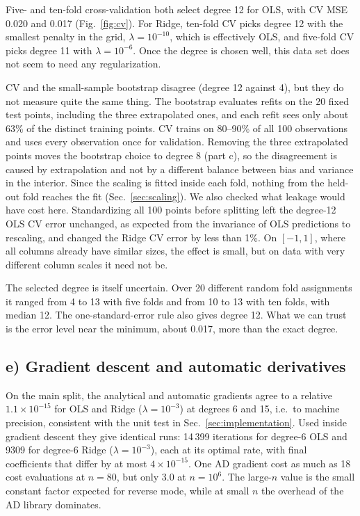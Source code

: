 \documentclass[aps,prb,reprint,superscriptaddress,nofootinbib,longbibliography,floatfix]{revtex4-2}
\begin{document}
Five- and ten-fold cross-validation both select degree 12 for OLS, with CV MSE 0.020 and 0.017 (Fig.~\ref{fig:cv}). For Ridge, ten-fold CV picks degree 12 with the smallest penalty in the grid, $\lambda=10^{-10}$, which is effectively OLS, and five-fold CV picks degree 11 with $\lambda=10^{-6}$. Once the degree is chosen well, this data set does not seem to need any regularization.

CV and the small-sample bootstrap disagree (degree 12 against 4), but they do not measure quite the same thing. The bootstrap evaluates refits on the 20 fixed test points, including the three extrapolated ones, and each refit sees only about 63\% of the distinct training points. CV trains on 80--90\% of all 100 observations and uses every observation once for validation. Removing the three extrapolated points moves the bootstrap choice to degree 8 (part c), so the disagreement is caused by extrapolation and not by a different balance between bias and variance in the interior. Since the scaling is fitted inside each fold, nothing from the held-out fold reaches the fit (Sec.~\ref{sec:scaling}). We also checked what leakage would have cost here. Standardizing all 100 points before splitting left the degree-12 OLS CV error unchanged, as expected from the invariance of OLS predictions to rescaling, and changed the Ridge CV error by less than 1\%. On $[-1,1]$, where all columns already have similar sizes, the effect is small, but on data with very different column scales it need not be.

The selected degree is itself uncertain. Over 20 different random fold assignments it ranged from 4 to 13 with five folds and from 10 to 13 with ten folds, with median 12. The one-standard-error rule \cite[Sec.~3.14]{HjorthJensen2026} also gives degree 12. What we can trust is the error level near the minimum, about 0.017, more than the exact degree.

\subsection{e) Gradient descent and automatic derivatives}\label{sec:res_gd}
On the main split, the analytical and automatic gradients agree to a relative $1.1\times10^{-15}$ for OLS and Ridge ($\lambda=10^{-3}$) at degrees 6 and 15, i.e.\ to machine precision, consistent with the unit test in Sec.~\ref{sec:implementation}. Used inside gradient descent they give identical runs: 14\,399 iterations for degree-6 OLS and 9309 for degree-6 Ridge ($\lambda=10^{-3}$), each at its optimal rate, with final coefficients that differ by at most $4\times10^{-15}$. One AD gradient cost as much as 18 cost evaluations at $n=80$, but only 3.0 at $n=10^6$. The large-$n$ value is the small constant factor expected for reverse mode, while at small $n$ the overhead of the AD library dominates.
\end{document}
